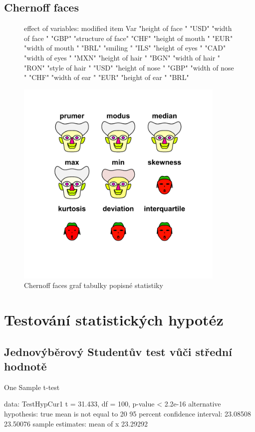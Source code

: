 \documentclass[a4paper]{ article}
\begin{document}
\subsection{Chernoff faces}
\begin{figure}[H]
\centering
\begin{Schunk}
\begin{Soutput}
effect of variables:
 modified item       Var  
 "height of face   " "USD"
 "width of face    " "GBP"
 "structure of face" "CHF"
 "height of mouth  " "EUR"
 "width of mouth   " "BRL"
 "smiling          " "ILS"
 "height of eyes   " "CAD"
 "width of eyes    " "MXN"
 "height of hair   " "BGN"
 "width of hair   "  "RON"
 "style of hair   "  "USD"
 "height of nose  "  "GBP"
 "width of nose   "  "CHF"
 "width of ear    "  "EUR"
 "height of ear   "  "BRL"
\end{Soutput}
\end{Schunk}
\includegraphics[width=10cm]{faces_graf.pdf}
\caption{Chernoff faces graf tabulky popisné statistiky}
\end{figure}
\clearpage

\section{Testování statistických hypotéz}
\subsection{Jednovýběrový Studentův test vůči střední hodnotě}
\begin{Schunk}
\begin{Soutput}
	One Sample t-test

data:  TestHypCur1
t = 31.433, df = 100, p-value < 2.2e-16
alternative hypothesis: true mean is not equal to 20
95 percent confidence interval:
 23.08508 23.50076
sample estimates:
mean of x 
 23.29292 
\end{Soutput}
\end{Schunk}
\end{document}
